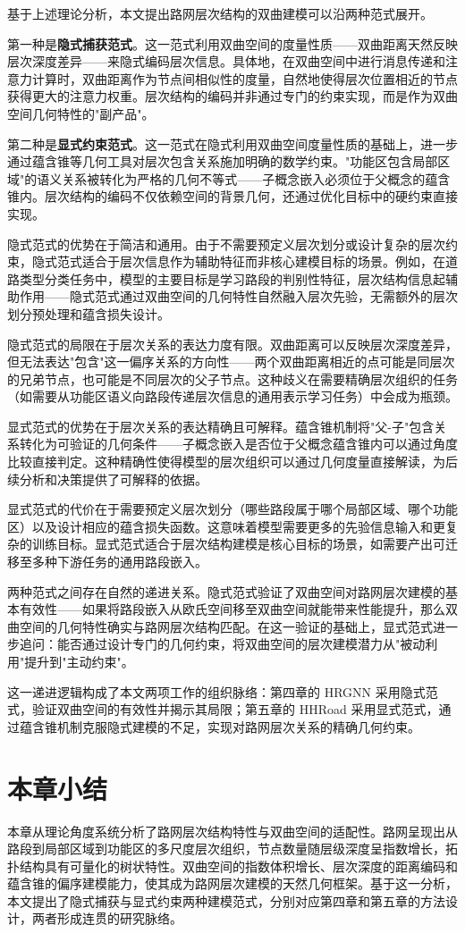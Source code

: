 基于上述理论分析，本文提出路网层次结构的双曲建模可以沿两种范式展开。

第一种是\textbf{隐式捕获范式}。这一范式利用双曲空间的度量性质——双曲距离天然反映层次深度差异——来隐式编码层次信息。具体地，在双曲空间中进行消息传递和注意力计算时，双曲距离作为节点间相似性的度量，自然地使得层次位置相近的节点获得更大的注意力权重。层次结构的编码并非通过专门的约束实现，而是作为双曲空间几何特性的"副产品"。

第二种是\textbf{显式约束范式}。这一范式在隐式利用双曲空间度量性质的基础上，进一步通过蕴含锥等几何工具对层次包含关系施加明确的数学约束。"功能区包含局部区域"的语义关系被转化为严格的几何不等式——子概念嵌入必须位于父概念的蕴含锥内。层次结构的编码不仅依赖空间的背景几何，还通过优化目标中的硬约束直接实现。

隐式范式的优势在于简洁和通用。由于不需要预定义层次划分或设计复杂的层次约束，隐式范式适合于层次信息作为辅助特征而非核心建模目标的场景。例如，在道路类型分类任务中，模型的主要目标是学习路段的判别性特征，层次结构信息起辅助作用——隐式范式通过双曲空间的几何特性自然融入层次先验，无需额外的层次划分预处理和蕴含损失设计。

隐式范式的局限在于层次关系的表达力度有限。双曲距离可以反映层次深度差异，但无法表达"包含"这一偏序关系的方向性——两个双曲距离相近的点可能是同层次的兄弟节点，也可能是不同层次的父子节点。这种歧义在需要精确层次组织的任务（如需要从功能区语义向路段传递层次信息的通用表示学习任务）中会成为瓶颈。

显式范式的优势在于层次关系的表达精确且可解释。蕴含锥机制将"父-子"包含关系转化为可验证的几何条件——子概念嵌入是否位于父概念蕴含锥内可以通过角度比较直接判定。这种精确性使得模型的层次组织可以通过几何度量直接解读，为后续分析和决策提供了可解释的依据。

显式范式的代价在于需要预定义层次划分（哪些路段属于哪个局部区域、哪个功能区）以及设计相应的蕴含损失函数。这意味着模型需要更多的先验信息输入和更复杂的训练目标。显式范式适合于层次结构建模是核心目标的场景，如需要产出可迁移至多种下游任务的通用路段嵌入。

两种范式之间存在自然的递进关系。隐式范式验证了双曲空间对路网层次建模的基本有效性——如果将路段嵌入从欧氏空间移至双曲空间就能带来性能提升，那么双曲空间的几何特性确实与路网层次结构匹配。在这一验证的基础上，显式范式进一步追问：能否通过设计专门的几何约束，将双曲空间的层次建模潜力从"被动利用"提升到"主动约束"。

这一递进逻辑构成了本文两项工作的组织脉络：第四章的 HRGNN 采用隐式范式，验证双曲空间的有效性并揭示其局限；第五章的 HHRoad 采用显式范式，通过蕴含锥机制克服隐式建模的不足，实现对路网层次关系的精确几何约束。

\section{本章小结}

本章从理论角度系统分析了路网层次结构特性与双曲空间的适配性。路网呈现出从路段到局部区域到功能区的多尺度层次组织，节点数量随层级深度呈指数增长，拓扑结构具有可量化的树状特性。双曲空间的指数体积增长、层次深度的距离编码和蕴含锥的偏序建模能力，使其成为路网层次建模的天然几何框架。基于这一分析，本文提出了隐式捕获与显式约束两种建模范式，分别对应第四章和第五章的方法设计，两者形成连贯的研究脉络。